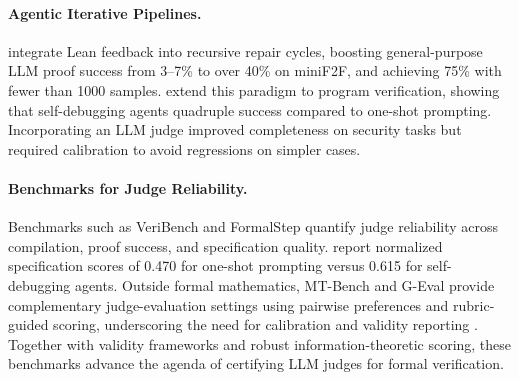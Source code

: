 \documentclass{article}
\begin{document}
\paragraph{Agentic Iterative Pipelines.}
\citet{ospanov2023apollo} integrate Lean feedback into recursive repair cycles, boosting general-purpose LLM proof success from 3--7\% to over 40\% on miniF2F, and achieving 75\% with fewer than 1000 samples. \citet{miranda2025veribench} extend this paradigm to program verification, showing that self-debugging agents quadruple success compared to one-shot prompting.
Incorporating an LLM judge improved completeness on security tasks but required calibration to avoid regressions on simpler cases.

\paragraph{Benchmarks for Judge Reliability.}
Benchmarks such as VeriBench and FormalStep quantify judge reliability across compilation, proof success, and specification quality.
\citet{miranda2025veribench} report normalized specification scores of 0.470 for one-shot prompting versus 0.615 for self-debugging agents.
Outside formal mathematics, MT-Bench and G-Eval provide complementary judge-evaluation settings using pairwise preferences and rubric-guided scoring, underscoring the need for calibration and validity reporting \citep{Zheng2023MTBench,Liu2023GEval}.
Together with validity frameworks and robust information-theoretic scoring, these benchmarks advance the agenda of certifying LLM judges for formal verification.

\end{document}
